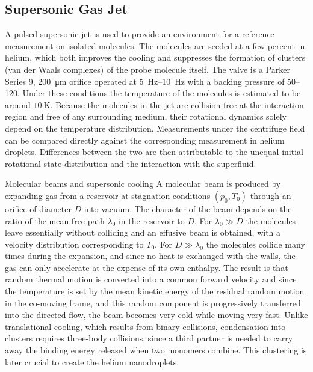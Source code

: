 \subsection{Supersonic Gas Jet}
A pulsed supersonic jet is used to provide an environment for a reference measurement on isolated molecules. The molecules are seeded at a few percent in helium, which both improves the cooling and suppresses the formation of clusters (van der Waals complexes) of the probe molecule itself. The valve is a Parker Series 9, \SI{200}{\micro\meter} orifice operated at \SIrange{5}{10}{\hertz} with a backing pressure of \SIrange{50}{120}{\ppsi}. Under these conditions the temperature of the molecules is estimated to be around $\SI{10}{\kelvin}$. Because the molecules in the jet are collision-free at the interaction region and free of any surrounding medium, their rotational dynamics solely depend on the temperature distribution. Measurements under the centrifuge field can be compared directly against the corresponding measurement in helium droplets. Differences between the two are then attributable to the unequal initial rotational state distribution and the interaction with the superfluid.
\begin{aside}{Molecular beams and supersonic cooling}
A molecular beam is produced by expanding gas from a reservoir at stagnation conditions $(p_0,  T_0)$ through an orifice of diameter $D$ into vacuum. The character of the beam depends on the ratio of the mean free path $\lambda_0$ in the reservoir to $D$. For $\lambda_0 \gg D$ the molecules leave essentially without colliding and an effusive beam is obtained, with a velocity distribution corresponding to $T_0$. For $D \gg \lambda_0$ the molecules collide many times during the expansion, and since no heat is exchanged with the walls, the gas can only accelerate at the expense of its own enthalpy. The result is that random thermal motion is converted into a common forward velocity and since the temperature is set by the mean kinetic energy of the residual random motion in the co-moving frame, and this random component is progressively transferred into the directed flow, the beam becomes very cold while moving very fast. 
Unlike translational cooling, which results from binary collisions, condensation into clusters requires three-body collisions, since a third partner is needed to carry away the binding energy released when two monomers combine. This clustering is later crucial to create the helium nanodroplets. \cite{morse2SupersonicBeam1996}
\end{aside}

